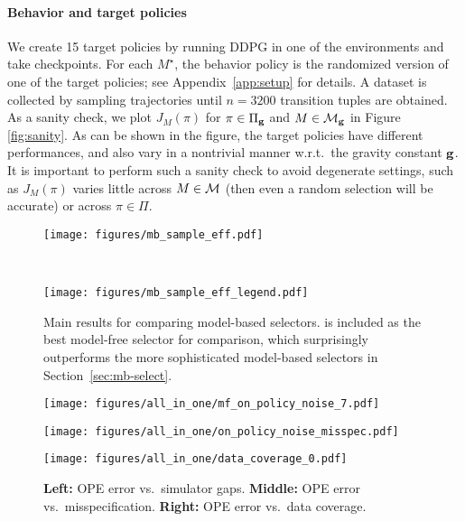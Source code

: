 \paragraph{Behavior and target policies} We create 15 target policies by running DDPG \cite{Lillicrap2015ContinuousCW} in one of the environments and take checkpoints.  %
For each $M^\star$, the behavior policy is the randomized version of one of the target policies; see Appendix~\ref{app:setup} for details. A dataset is collected by  sampling trajectories until $n=3200$ transition tuples are obtained. %
%
%
As a sanity check, we plot $J_M(\pi)$ for $\pi \in \Pi_{\mathbf{g}}$ and  $M \in \mathcal{M}_{\mathbf{g}}$ in Figure \ref{fig:sanity}. 
%
As can be shown in the figure, the target policies have different performances, and also vary in a nontrivial manner w.r.t.~the gravity constant $\mathbf{g}$. It is important to perform such a sanity check to avoid degenerate settings, such as $J_{M}(\pi)$ varies little across $M\in\mathcal{M}$ (then even a random selection will be accurate) or across $\pi\in\Pi$. %

%
%
%


\begin{figure*}[t]
    \centering
    \begin{minipage}{0.66\textwidth}
        \texttt{[image: figures/mb\_sample\_eff.pdf]}
    \end{minipage}%
    ~
    \begin{minipage}{0.34\textwidth}
                \texttt{[image: figures/mb\_sample\_eff\_legend.pdf]}
        \caption{Main results for comparing model-based selectors. \lstd %
        is included as the best model-free selector for comparison, which surprisingly outperforms the more sophisticated model-based selectors in Section~\ref{sec:mb-select}.%
        \label{fig:mb}}
   \end{minipage}
\end{figure*}




\begin{figure*}
    \centering
    \begin{minipage}{0.22\textwidth}
        \texttt{[image: figures/all\_in\_one/mf\_on\_policy\_noise\_7.pdf]}
    \end{minipage}%
    \begin{minipage}{0.22\textwidth}
        \texttt{[image: figures/all\_in\_one/on\_policy\_noise\_misspec.pdf]}
    \end{minipage}%
    \begin{minipage}{0.46\textwidth}
        \texttt{[image: figures/all\_in\_one/data\_coverage\_0.pdf]}
    \end{minipage}%
    \caption{\textbf{Left:} OPE error vs.~simulator gaps. \textbf{Middle:} OPE error vs.~misspecification. \textbf{Right:} OPE error vs.~data coverage.
    \label{fig:misc} }
\end{figure*}


